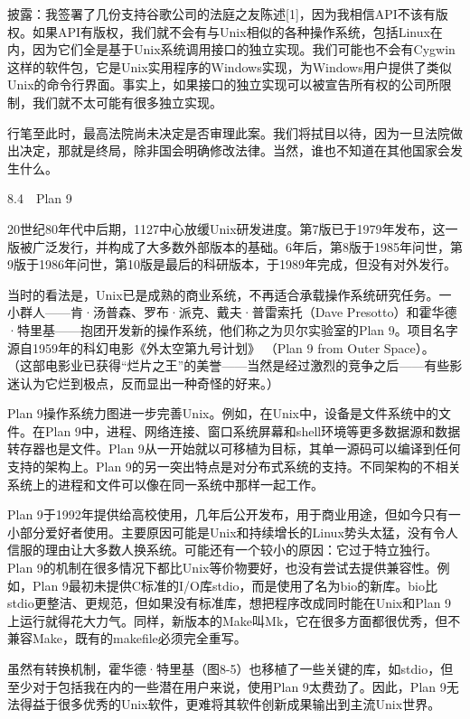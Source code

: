\documentclass[a4paper,12pt,UTF8,twoside]{ctexbook}
\begin{document}
{{披露：我签署了几份支持谷歌公司的法庭之友陈述[1]，因为我相信API不该有版权。如果API有版权，我们就不会有与Unix相似的各种操作系统，包括Linux在内，因为它们全是基于Unix系统调用接口的独立实现。我们可能也不会有Cygwin这样的软件包，它是Unix实用程序的Windows实现，为Windows用户提供了类似Unix的命令行界面。事实上，如果接口的独立实现可以被宣告所有权的公司所限制，我们就不太可能有很多独立实现。

行笔至此时，最高法院尚未决定是否审理此案。我们将拭目以待，因为一旦法院做出决定，那就是终局，除非国会明确修改法律。当然，谁也不知道在其他国家会发生什么。





8.4　Plan 9


20世纪80年代中后期，1127中心放缓Unix研发进度。第7版已于1979年发布，这一版被广泛发行，并构成了大多数外部版本的基础。6年后，第8版于1985年问世，第9版于1986年问世，第10版是最后的科研版本，于1989年完成，但没有对外发行。

当时的看法是，Unix已是成熟的商业系统，不再适合承载操作系统研究任务。一小群人——肯·汤普森、罗布·派克、戴夫·普雷索托（Dave Presotto）和霍华德·特里基——抱团开发新的操作系统，他们称之为贝尔实验室的Plan 9。项目名字源自1959年的科幻电影《外太空第九号计划》 （Plan 9 from Outer Space）。 （这部电影业已获得“烂片之王”的美誉——当然是经过激烈的竞争之后——有些影迷认为它烂到极点，反而显出一种奇怪的好来。）

Plan 9操作系统力图进一步完善Unix。例如，在Unix中，设备是文件系统中的文件。在Plan 9中，进程、网络连接、窗口系统屏幕和shell环境等更多数据源和数据转存器也是文件。Plan 9从一开始就以可移植为目标，其单一源码可以编译到任何支持的架构上。Plan 9的另一突出特点是对分布式系统的支持。不同架构的不相关系统上的进程和文件可以像在同一系统中那样一起工作。

Plan 9于1992年提供给高校使用，几年后公开发布，用于商业用途，但如今只有一小部分爱好者使用。主要原因可能是Unix和持续增长的Linux势头太猛，没有令人信服的理由让大多数人换系统。可能还有一个较小的原因：它过于特立独行。Plan 9的机制在很多情况下都比Unix等价物要好，也没有尝试去提供兼容性。例如，Plan 9最初未提供C标准的I/O库stdio，而是使用了名为bio的新库。bio比stdio更整洁、更规范，但如果没有标准库，想把程序改成同时能在Unix和Plan 9上运行就得花大力气。同样，新版本的Make叫Mk，它在很多方面都很优秀，但不兼容Make，既有的makefile必须完全重写。

虽然有转换机制，霍华德·特里基（图8-5）也移植了一些关键的库，如stdio，但至少对于包括我在内的一些潜在用户来说，使用Plan 9太费劲了。因此，Plan 9无法得益于很多优秀的Unix软件，更难将其软件创新成果输出到主流Unix世界。



}}
\end{document}

